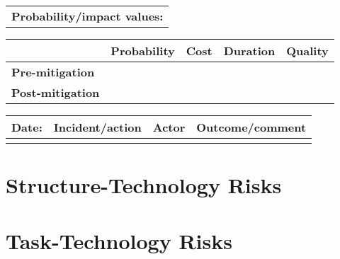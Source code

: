 \begin{table}
\begin{tabularx}{\textwidth}{| X |}
	\end{tabularx}
	\begin{tabularx}{\textwidth}{| X |}
		\hline
		\textbf{Probability/impact values:} \\
	\end{tabularx}
	\begin{tabularx}{\textwidth}{| l | l | X | X | X |}
		\hline
		 &  \textbf{Probability} & \textbf{Cost} & \textbf{Duration} & \textbf{Quality} \\ \hline
		\textbf{Pre-mitigation} & & & & \\ \hline
		\textbf{Post-mitigation} & & & & \\ \hline \hline
	\end{tabularx}
	\begin{tabularx}{\textwidth}{| l | X | l | X |}
		\hline
		\textbf{Date:} & \textbf{Incident/action} & \textbf{Actor} & \textbf{Outcome/comment} \\ \hline
		 & &  &  \\ \hline
	\end{tabularx}%
\end{table}

\FloatBarrier

\section{Structure-Technology Risks}
\label{Structure-Technology_Risks}

\FloatBarrier

\FloatBarrier

\section{Task-Technology Risks}
\label{Task-Technology_Risks}

\FloatBarrier

\FloatBarrier